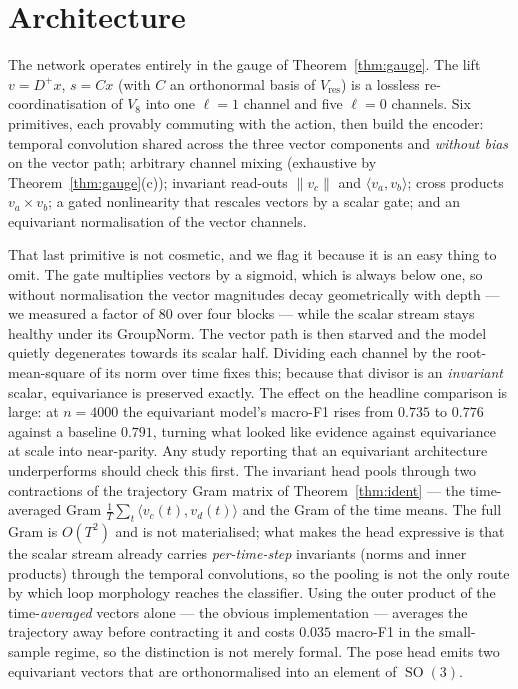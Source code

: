 \documentclass[11pt]{article}
\theoremstyle{definition}
\DeclareMathOperator{\SO}{SO}
\newcommand{\Vres}{V_{\mathrm{res}}}
\newcommand{\Veight}{V_{8}}
\begin{document}
\section{Architecture}\label{sec:arch}

The network operates entirely in the gauge of Theorem~\ref{thm:gauge}. The lift
$v = D^{+}x$, $s = Cx$ (with $C$ an orthonormal basis of $\Vres$) is a lossless
re-coordinatisation of $\Veight$ into one $\ell{=}1$ channel and five $\ell{=}0$
channels. Six primitives, each provably commuting with the action, then build the
encoder: temporal convolution shared across the three vector components and
\emph{without bias} on the vector path; arbitrary channel mixing (exhaustive by
Theorem~\ref{thm:gauge}(c)); invariant read-outs $\|v_c\|$ and $\langle v_a,v_b\rangle$;
cross products $v_a \times v_b$; a gated nonlinearity that rescales vectors by a
scalar gate; and an equivariant normalisation of the vector channels.

That last primitive is not cosmetic, and we flag it because it is an easy thing to
omit. The gate multiplies vectors by a sigmoid, which is always below one, so without
normalisation the vector magnitudes decay geometrically with depth --- we measured a
factor of $80$ over four blocks --- while the scalar stream stays healthy under its
GroupNorm. The vector path is then starved and the model quietly degenerates towards
its scalar half. Dividing each channel by the root-mean-square of its norm over time
fixes this; because that divisor is an \emph{invariant} scalar, equivariance is
preserved exactly. The effect on the headline comparison is large: at $n = 4000$ the
equivariant model's macro-F1 rises from $0.735$ to $0.776$ against a baseline $0.791$,
turning what looked like evidence against equivariance at scale into near-parity. Any
study reporting that an equivariant architecture underperforms should check this
first. The invariant head pools through two contractions of the trajectory Gram matrix of
Theorem~\ref{thm:ident} --- the time-averaged Gram $\tfrac{1}{T}\sum_t \langle
v_c(t), v_d(t)\rangle$ and the Gram of the time means. The full Gram is $O(T^2)$ and is
not materialised; what makes the head expressive is that the scalar stream already
carries \emph{per-time-step} invariants (norms and inner products) through the
temporal convolutions, so the pooling is not the only route by which loop morphology
reaches the classifier. Using the outer product of the time-\emph{averaged} vectors
alone --- the obvious implementation --- averages the trajectory away before
contracting it and costs $0.035$ macro-F1 in the small-sample regime, so the
distinction is not merely formal. The pose head emits two equivariant vectors that are
orthonormalised into an element of $\SO(3)$.
\end{document}
